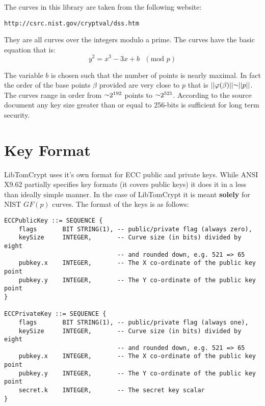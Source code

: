 \documentclass[a4paper]{book}
\def\approx{\raisebox{0.2ex}{\mbox{\small $\sim$}}}
\def\phi{\varphi}
\begin{document}
The curves in this library are taken from the following website:
\begin{verbatim}
http://csrc.nist.gov/cryptval/dss.htm
\end{verbatim}

They are all curves over the integers modulo a prime.  The curves have the basic equation that is:
\begin{equation}
y^2 = x^3 - 3x + b\mbox{ }(\mbox{mod }p)
\end{equation}

The variable $b$ is chosen such that the number of points is nearly maximal.  In fact the order of the base points $\beta$ 
provided are very close to $p$ that is $\vert \vert \phi(\beta) \vert \vert \approx \vert \vert p \vert \vert$.  The curves
range in order from $\approx 2^{192}$ points to $\approx 2^{521}$.  According to the source document any key size greater
than or equal to 256-bits is sufficient for long term security.  

\section{Key Format}
LibTomCrypt uses it's own format for ECC public and private keys.  While ANSI X9.62 partially specifies key formats (it covers public keys) it does it in a less
than ideally simple manner.  In the case of LibTomCrypt it is meant \textbf{solely} for NIST $GF(p)$ curves.  The format of the keys is as follows:

\begin{small}
\begin{verbatim}
ECCPublicKey ::= SEQUENCE {
    flags       BIT STRING(1), -- public/private flag (always zero), 
    keySize     INTEGER,       -- Curve size (in bits) divided by eight 
                               -- and rounded down, e.g. 521 => 65
    pubkey.x    INTEGER,       -- The X co-ordinate of the public key point
    pubkey.y    INTEGER,       -- The Y co-ordinate of the public key point
}

ECCPrivateKey ::= SEQUENCE {
    flags       BIT STRING(1), -- public/private flag (always one), 
    keySize     INTEGER,       -- Curve size (in bits) divided by eight 
                               -- and rounded down, e.g. 521 => 65
    pubkey.x    INTEGER,       -- The X co-ordinate of the public key point
    pubkey.y    INTEGER,       -- The Y co-ordinate of the public key point
    secret.k    INTEGER,       -- The secret key scalar
}
\end{verbatim}
\end{small}
\end{document}

